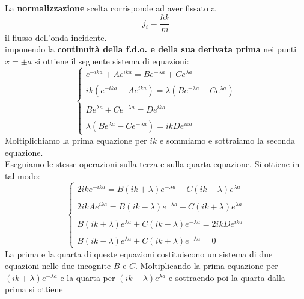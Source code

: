 \documentclass[a4paper,12pt,twoside]{book}
\begin{document}
La \textbf{normalizzazione} scelta corrisponde ad aver fissato a
\begin{equation}
j_i= \frac{\hbar k}{m}
\end{equation}
il flusso dell'onda incidente.\\
imponendo la \textbf{continuità della f.d.o. e della sua derivata prima} nei punti $x=\pm a$ si ottiene il seguente sistema di equazioni:
\begin{equation}
\begin{cases}
\displaystyle{e^{-ika}+ Ae^{ika}= Be^{-\lambda a} + C e^{\lambda a}}\\
\\
\displaystyle{ik \left(e^{-ika}+ Ae^{ika}\right)= \lambda \left(Be^{-\lambda a} - C e^{\lambda a}\right)}\\
\\
\displaystyle{Be^{\lambda a} + Ce^{-\lambda a}= De^{ika}}\\
\\
\displaystyle{\lambda \left(Be^{\lambda a} -Ce^{-\lambda a} \right)= ikDe^{ika}}
\end{cases}
\end{equation}
Moltiplichiamo la prima equazione per $ik$ e sommiamo e sottraiamo la seconda equazione.\\
Eseguiamo le stesse operazioni sulla terza e sulla quarta equazione. Si ottiene in tal modo:
\begin{equation}
\begin{cases}
\displaystyle{2ike^{-ika}= B \left(ik+\lambda\right)e^{-\lambda a} +C \left(ik-\lambda\right)e^{\lambda a} }\\
\\
\displaystyle{2ikAe^{ika}= B \left(ik-\lambda\right)e^{-\lambda a} +C \left(ik+\lambda\right)e^{\lambda a} }\\
\\
\displaystyle{B\left(ik+\lambda\right)e^{\lambda a} + C\left(ik-\lambda\right)e^{-\lambda a} = 2ikD e^{ika}}\\
\\
\displaystyle{B\left(ik-\lambda\right)e^{\lambda a} + C\left(ik+\lambda\right)e^{-\lambda a} =0}
\end{cases}
\label{eq:cap10_10}
\end{equation}
La prima e la quarta di queste equazioni costituiscono un sistema di due equazioni nelle due incognite $B$ e $C$. Moltiplicando la prima equazione per $(ik+\lambda) e^{-\lambda a }$ e la quarta per $(ik-\lambda) e^{\lambda a }$ e sottraendo poi la quarta dalla prima si ottiene
\end{document}
